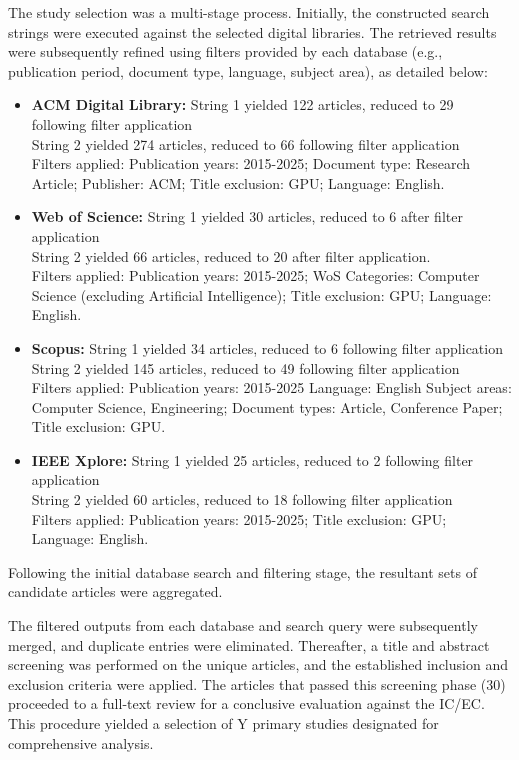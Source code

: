 The study selection was a multi-stage process. Initially, the constructed search strings were executed against the selected digital libraries. The retrieved results were subsequently refined using filters provided by each database (e.g., publication period, document type, language, subject area), as detailed below:
\begin{itemize}
    \item \textbf{ACM Digital Library:}
    String 1 yielded 122 articles, reduced to 29 following filter application \\
    String 2 yielded 274 articles, reduced to 66 following filter application \\
    Filters applied:
    Publication years: 2015-2025;
    Document type: Research Article;
    Publisher: ACM;
    Title exclusion: GPU;
    Language: English.
    \item \textbf{Web of Science:}
    String 1 yielded 30 articles, reduced to 6 after filter application \\
    String 2 yielded 66 articles, reduced to 20 after filter application. \\
    Filters applied:
    Publication years: 2015-2025;
    WoS Categories: Computer Science (excluding Artificial Intelligence);
    Title exclusion: GPU;
    Language: English.
    \item \textbf{Scopus:}
    String 1 yielded 34 articles, reduced to 6 following filter application \\
    String 2 yielded 145 articles, reduced to 49 following filter application \\
    Filters applied:
    Publication years: 2015-2025
    Language: English
    Subject areas: Computer Science, Engineering;
    Document types: Article, Conference Paper;
    Title exclusion: GPU.
    \item \textbf{IEEE Xplore:}
    String 1 yielded 25 articles, reduced to 2 following filter application \\
    String 2 yielded 60 articles, reduced to 18 following filter application \\
    Filters applied:
    Publication years: 2015-2025;
    Title exclusion: GPU;
    Language: English.
\end{itemize}

Following the initial database search and filtering stage, the resultant sets of candidate articles were aggregated.

The filtered outputs from each database and search query were subsequently merged, and duplicate entries were eliminated. Thereafter, a title and abstract screening was performed on the unique articles, and the established inclusion and exclusion criteria were applied. The articles that passed this screening phase (30) proceeded to a full-text review for a conclusive evaluation against the IC/EC. This procedure yielded a selection of Y primary studies designated for comprehensive analysis.

